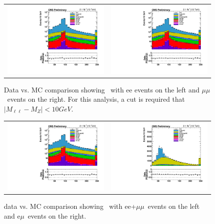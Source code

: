 \begin{figure}[!ht]
  \begin{center}
    \begin{tabular}{cc}
      \includegraphics[width=0.4\linewidth]{evtsel/figs/h_mll_ee_signalregion_inclusive_passtrig.pdf} &
      \includegraphics[width=0.4\linewidth]{evtsel/figs/h_mll_mm_signalregion_inclusive_passtrig.pdf} \\
    \end{tabular}
    \caption{
      \label{fig:datavsmc_mll_eemm}
      Data vs. MC comparison showing \mll\ with ee events on the left and $\mu\mu$~events on the right.
      For this analysis, a cut is required that $|M_{\ell\ell}-M_{Z}| < 10 GeV$.
    }
  \end{center}
\end{figure}

\begin{figure}[!ht]
  \begin{center}
    \begin{tabular}{cc}
      \includegraphics[width=0.4\linewidth]{evtsel/figs/h_mll_ll_signalregion_inclusive_passtrig.pdf} &
      \includegraphics[width=0.4\linewidth]{evtsel/figs/h_mll_em_signalregion_inclusive_passtrig.pdf} \\
    \end{tabular}
    \caption{
      \label{fig:datavsmc_mll_emll}
      data vs. MC comparison showing \mll\ with ee+$\mu\mu$~events on the left and e$\mu$~events on the right.
    }
  \end{center}
\end{figure}


